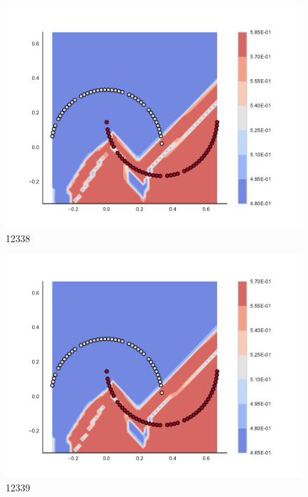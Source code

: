 \begin{subfigure}[b]{0.09\textwidth}
    \includegraphics[clip, trim=2.35cm 1.75cm 4.5cm 0cm,width=\textwidth]{img/convergence/12338.pdf}
    \caption{12338}
    \label{fig:convergence_12338}
\end{subfigure}
%
\begin{subfigure}[b]{0.09\textwidth}
    \includegraphics[clip, trim=2.35cm 1.75cm 4.5cm 0cm,width=\textwidth]{img/convergence/12339.pdf}
    \caption{12339}
    \label{fig:convergence_12339}
\end{subfigure}
%
